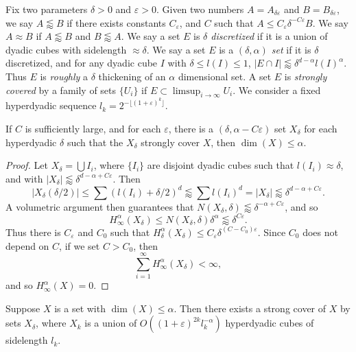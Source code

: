 Fix two parameters $\delta > 0$ and $\varepsilon > 0$. Given two numbers $A = A_{\delta \varepsilon}$ and $B = B_{\delta \varepsilon}$, we say $A \lessapprox B$ if there exists constants $C_\varepsilon$, and $C$ such that $A \leq C_\varepsilon \delta^{-C\varepsilon} B$. We say $A \approx B$ if $A \lessapprox B$ and $B \lessapprox A$. We say a set $E$ is \emph{$\delta$ discretized} if it is a union of dyadic cubes with sidelength $\approx \delta$. We say a set $E$ is a \emph{$(\delta,\alpha)$ set} if it is $\delta$ discretized, and for any dyadic cube $I$ with $\delta \leq l(I) \leq 1$, $|E \cap I| \lessapprox \delta^{d-\alpha} l(I)^\alpha$. Thus $E$ is \emph{roughly} a $\delta$ thickening of an $\alpha$ dimensional set. A set $E$ is \emph{strongly covered} by a family of sets $\{ U_i \}$ if $E \subset \limsup_{i \to \infty} U_i$. We consider a fixed hyperdyadic sequence $l_k = 2^{- \lfloor (1 + \varepsilon)^k \rfloor}$.

\begin{lemma}
	If $C$ is sufficiently large, and for each $\varepsilon$, there is a $(\delta, \alpha - C \varepsilon)$ set $X_\delta$ for each hyperdyadic $\delta$ such that the $X_\delta$ strongly cover $X$, then $\dim(X) \leq \alpha$.
\end{lemma}
\begin{proof}
	Let $X_\delta = \bigcup I_i$, where $\{ I_i \}$ are disjoint dyadic cubes such that $l(I_i) \approx \delta$, and with $|X_\delta| \lessapprox \delta^{d-\alpha + C\varepsilon}$. Then
	\[ |X_\delta(\delta/2)| \leq \sum (l(I_i) + \delta/2)^d \lessapprox \sum l(I_i)^d = |X_\delta| \lessapprox \delta^{d - \alpha + C\varepsilon}. \]
	A volumetric argument then guarantees that $N(X_\delta,\delta) \lessapprox \delta^{-\alpha + C\varepsilon}$, and so
	\[ H^\alpha_\infty(X_\delta) \leq N(X_\delta,\delta) \delta^\alpha \lessapprox \delta^{C\varepsilon}. \]
	Thus there is $C_\varepsilon$ and $C_0$ such that $H^\alpha_\delta(X_\delta) \leq C_\varepsilon \delta^{(C - C_0) \varepsilon}$. Since $C_0$ does not depend on $C$, if we set $C > C_0$, then
	\[ \sum_{i = 1}^\infty H^\alpha_\infty(X_\delta) < \infty, \]
	and so $H^\alpha_\infty(X) = 0$.
\end{proof}

\begin{theorem}
	Suppose $X$ is a set with $\dim(X) \leq \alpha$. Then there exists a strong cover of $X$ by sets $X_\delta$, where $X_k$ is a union of $O((1 + \varepsilon)^{2k} l_k^{-\alpha})$ hyperdyadic cubes of sidelength $l_k$.
\end{theorem}

